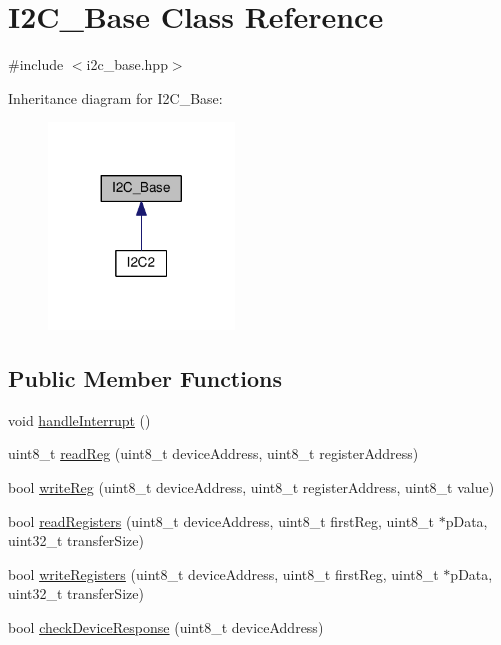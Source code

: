 \hypertarget{classI2C__Base}{}\section{I2\+C\+\_\+\+Base Class Reference}
\label{classI2C__Base}


{\ttfamily \#include $<$i2c\+\_\+base.\+hpp$>$}



Inheritance diagram for I2\+C\+\_\+\+Base\+:\nopagebreak
\begin{figure}[H]
\begin{center}
\leavevmode
\includegraphics[width=140pt]{d0/d68/classI2C__Base__inherit__graph}
\end{center}
\end{figure}
\subsection*{Public Member Functions}
\begin{DoxyCompactItemize}
\item 
void \hyperlink{classI2C__Base_a91503a44a5f9ff228354245c8c6ec9bc}{handle\+Interrupt} ()
\item 
uint8\+\_\+t \hyperlink{classI2C__Base_ad5322c60fd88a0920df335964613c76c}{read\+Reg} (uint8\+\_\+t device\+Address, uint8\+\_\+t register\+Address)
\item 
bool \hyperlink{classI2C__Base_a1f71fbf12351a0e5f1c0e0452e999b17}{write\+Reg} (uint8\+\_\+t device\+Address, uint8\+\_\+t register\+Address, uint8\+\_\+t value)
\item 
bool \hyperlink{classI2C__Base_a8def06ef5ebcdc8fb5f3a21f4a4be166}{read\+Registers} (uint8\+\_\+t device\+Address, uint8\+\_\+t first\+Reg, uint8\+\_\+t $\ast$p\+Data, uint32\+\_\+t transfer\+Size)
\item 
bool \hyperlink{classI2C__Base_a11db0de4b6517813d50752b9f053dc5f}{write\+Registers} (uint8\+\_\+t device\+Address, uint8\+\_\+t first\+Reg, uint8\+\_\+t $\ast$p\+Data, uint32\+\_\+t transfer\+Size)
\item 
bool \hyperlink{classI2C__Base_a7b1ffc13066ed8b2a2443fdec63f6d27}{check\+Device\+Response} (uint8\+\_\+t device\+Address)
\end{DoxyCompactItemize}

